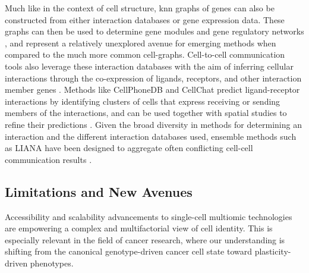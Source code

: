 Much like in the context of cell structure, \acrshort{knn} graphs of genes can also be constructed from either interaction databases or gene expression data. These graphs can then be used to determine gene modules and gene regulatory networks \cite{aibar_scenic_2017}, and represent a relatively unexplored avenue for emerging methods when compared to the much more common cell-graphs.
Cell-to-cell communication tools also leverage these interaction databases with the aim of inferring cellular interactions through the co-expression of ligands, receptors, and other interaction member genes \cite{armingol_deciphering_2020}. Methods like CellPhoneDB \cite{efremova_cellphonedb_2020} and CellChat \cite{jin_inference_2021} predict ligand-receptor interactions by identifying clusters of cells that express receiving or sending members of the interactions, and can be used together with spatial studies to refine their predictions \cite{hu_cytotalk_2021,kanemaru_spatially_2023}. Given the broad diversity in methods for determining an interaction and the different interaction databases used, ensemble methods such as LIANA have been designed to aggregate often conflicting cell-cell communication results \cite{dimitrov_comparison_2022, baghdassarian_combining_2023}. 


\subsection{Limitations and New Avenues}

Accessibility and scalability advancements to single-cell multiomic technologies are empowering a complex and multifactorial view of cell identity. This is especially relevant in the field of cancer research, where our understanding is shifting from the canonical genotype-driven cancer cell state toward plasticity-driven phenotypes. 

